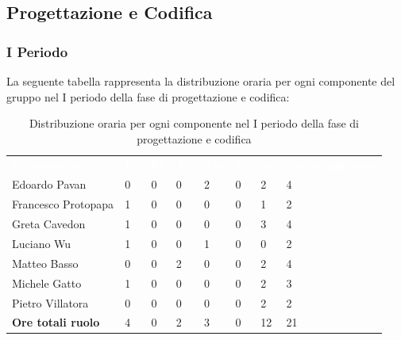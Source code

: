 \subsection{Progettazione e Codifica}
\subsubsection{I Periodo}
La seguente tabella rappresenta la distribuzione oraria per ogni componente del gruppo nel I periodo della fase di progettazione e codifica:
\begin{table}[H]
\begin{center}
\renewcommand{\arraystretch}{1.25}
\begin{tabular}{ m{}<{\centering}  m{}<{\centering} m{}<{\centering} m{}<{\centering}  m{}<{\centering}  m{}<{\centering}  m{}<{\centering}  m{}<{\centering}   }
	\rowcolor{darkblue}
	\textcolor{white}{\textbf{Componente}} &\textcolor{white}{\textbf{Re}}&\textcolor{white}{\textbf{Pt}}&\textcolor{white}{\textbf{An}}&\textcolor{white}{\textbf{Am}}&\textcolor{white}{\textbf{Pr}}&\textcolor{white}{\textbf{Ve}}&\textcolor{white}{\textbf{Ore complessive}}\\ 
	Edoardo Pavan & 0 & 0 & 0 & 2 & 0 & 2 & 4 \\	
	
	Francesco Protopapa & 1 & 0 & 0 & 0 & 0 & 1 & 2 \\

	Greta Cavedon & 1 & 0 & 0 & 0 & 0 & 3 & 4 \\
	
	Luciano Wu & 1 & 0 & 0 & 1 & 0 & 0 & 2 \\
	
	Matteo Basso & 0 & 0 & 2 & 0 & 0 & 2 & 4 \\
	
	Michele Gatto & 1 & 0 & 0 & 0 & 0 & 2 & 3 \\
	
	Pietro Villatora & 0 & 0 & 0 & 0 & 0 & 2 & 2 \\
	
	\textbf{Ore totali ruolo} & 4 & 0 & 2 & 3 & 0 & 12 & 21 \\

\end{tabular}
\caption{Distribuzione oraria per ogni componente nel I periodo della fase di progettazione e codifica}
\end{center}
\end{table}

